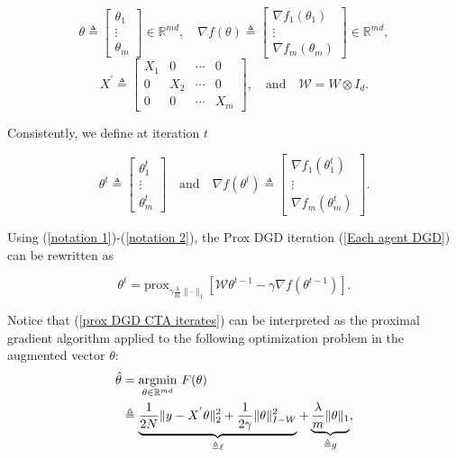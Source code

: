 \documentclass{article}
\theoremstyle{break}
\newcommand{\T}{\theta}
\begin{document}
\begin{equation}\label{notation 1}
    \T\triangleq\begin{bmatrix}
\theta_1\\
\vdots\\
\theta_m
\end{bmatrix}\in\mathbb{R}^{m d}, \quad \nabla f(\T)\triangleq\begin{bmatrix}
\nabla f_1(\theta_1)\\
\vdots\\
\nabla f_m(\theta_m)
\end{bmatrix}\in\mathbb{R}^{m d},\end{equation}
\begin{equation}
X^{'}\triangleq\left[
 \begin{matrix}
   X_1 & 0 & \cdots & 0 \\
   0 & X_2 & \cdots& 0 \\
   0 & 0 & \cdots& X_m
  \end{matrix}
  \right], \quad\text{and}\quad \mathcal{W}=W\otimes I_d.
\end{equation}

Consistently, we define at iteration $t$

\begin{equation}\label{notation 2}
    \T^t\triangleq\begin{bmatrix}
\theta_1^t\\
\vdots\\
\theta_m^t
\end{bmatrix} \quad\text{and}\quad \nabla f(\T^{t})\triangleq\begin{bmatrix}
\nabla f_1(\theta_1^t)\\
\vdots\\
\nabla f_m(\theta_m^t)
\end{bmatrix}.
\end{equation}

Using (\ref{notation 1})-(\ref{notation 2}), the Prox DGD iteration (\ref{Each agent DGD}) can be rewritten as

\begin{equation}\label{prox DGD CTA iterates}
    \T^t=\text{prox}_{\gamma \frac{\lambda}{m}\lVert\cdot\rVert_1}[ \mathcal{W}\T^{t-1}-\gamma\nabla f(\T^{t-1})].
\end{equation}

Notice that (\ref{prox DGD CTA iterates}) can be interpreted as the proximal gradient algorithm applied to the following optimization problem in the augmented vector $\theta:$
\begin{align}\label{Change problem}
    \hat{\T}&=\underset{\T\in\mathbb{R}^{m d}}{\text{argmin}} \text{ } F(\T)\notag\\
    &\triangleq\underbrace{\frac{1}{2N}\lVert y-X^{'}\theta\rVert^2_2+\frac{1}{2\gamma}\lVert\T\rVert_{I-W}^2}_{\triangleq \ell}+\underbrace{\frac{\lambda}{m}\lVert\theta\rVert_1}_{\triangleq g},
\end{align}
\end{document}
